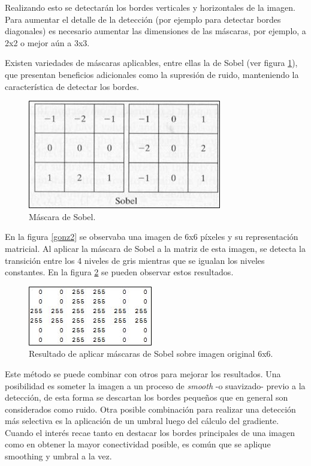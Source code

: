 Realizando esto se detectarán los bordes verticales y horizontales de la imagen. Para aumentar el detalle de la detección (por ejemplo para detectar bordes diagonales) es necesario aumentar las dimensiones de las máscaras, por ejemplo, a 2x2 o mejor aún a 3x3.

Existen variedades de máscaras aplicables, entre ellas la de Sobel (ver figura \ref{gonz5}), que presentan beneficios adicionales como la supresión de ruido, manteniendo la característica de detectar los bordes.

\begin{figure}[H]
\begin{center}
\includegraphics[scale=0.8]{img/08_matriz_sobel.jpg}
\end{center}
\caption{Máscara de Sobel.}
\label{gonz5}
\end{figure}

En la figura \ref{gonz2} se observaba una imagen de 6x6 píxeles y su representación matricial. Al aplicar la máscara de Sobel a la matriz de esta imagen, se detecta la transición entre los 4 niveles de gris mientras que se igualan los niveles constantes. En la figura \ref{gonz6} se pueden observar estos resultados.

\begin{figure}[H]
\begin{center}
\includegraphics[scale=0.8]{img/09_escala_grises_deteccion_borde.jpg}
\end{center}
\caption{Resultado de aplicar máscaras de Sobel sobre imagen original 6x6.}
\label{gonz6}
\end{figure}

 Este método se puede combinar con otros para mejorar los resultados. Una posibilidad es someter la imagen a un proceso de \textit{smooth}\cite{smooth} -o suavizado- previo a la detección, de esta forma se descartan los bordes pequeños que en general son considerados como ruido. Otra posible combinación para realizar una detección más selectiva es la aplicación de un umbral luego del cálculo del gradiente. Cuando el interés recae tanto en destacar los bordes principales de una imagen como en obtener la mayor conectividad posible, es común que se aplique smoothing y umbral a la vez.

